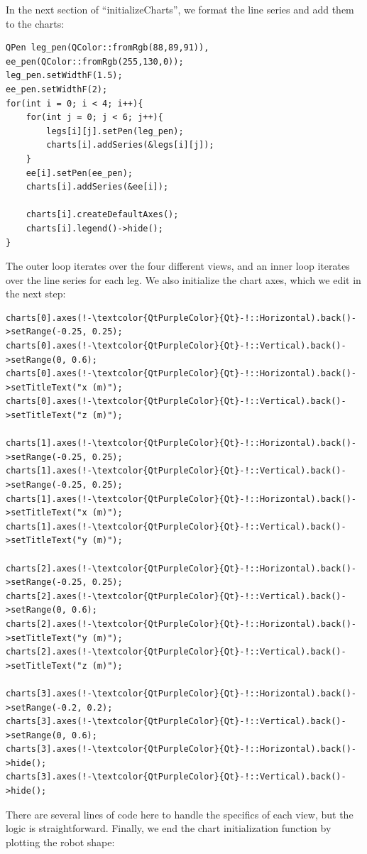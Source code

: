 \documentclass[12pt]{article}
\begin{document}
\newpage \noindent
In the next section of ``initializeCharts'', we format the line series and add them to the charts:
\begin{lstlisting}
QPen leg_pen(QColor::fromRgb(88,89,91)), ee_pen(QColor::fromRgb(255,130,0));
leg_pen.setWidthF(1.5);
ee_pen.setWidthF(2);
for(int i = 0; i < 4; i++){
    for(int j = 0; j < 6; j++){
        legs[i][j].setPen(leg_pen);
        charts[i].addSeries(&legs[i][j]);
    }
    ee[i].setPen(ee_pen);
    charts[i].addSeries(&ee[i]);

    charts[i].createDefaultAxes();
    charts[i].legend()->hide();
}
\end{lstlisting}
The outer loop iterates over the four different views, and an inner loop iterates over the line series for each leg. We also initialize the chart axes, which we edit in the next step:
\begin{lstlisting}
charts[0].axes(!-\textcolor{QtPurpleColor}{Qt}-!::Horizontal).back()->setRange(-0.25, 0.25);
charts[0].axes(!-\textcolor{QtPurpleColor}{Qt}-!::Vertical).back()->setRange(0, 0.6);
charts[0].axes(!-\textcolor{QtPurpleColor}{Qt}-!::Horizontal).back()->setTitleText("x (m)");
charts[0].axes(!-\textcolor{QtPurpleColor}{Qt}-!::Vertical).back()->setTitleText("z (m)");

charts[1].axes(!-\textcolor{QtPurpleColor}{Qt}-!::Horizontal).back()->setRange(-0.25, 0.25);
charts[1].axes(!-\textcolor{QtPurpleColor}{Qt}-!::Vertical).back()->setRange(-0.25, 0.25);
charts[1].axes(!-\textcolor{QtPurpleColor}{Qt}-!::Horizontal).back()->setTitleText("x (m)");
charts[1].axes(!-\textcolor{QtPurpleColor}{Qt}-!::Vertical).back()->setTitleText("y (m)");

charts[2].axes(!-\textcolor{QtPurpleColor}{Qt}-!::Horizontal).back()->setRange(-0.25, 0.25);
charts[2].axes(!-\textcolor{QtPurpleColor}{Qt}-!::Vertical).back()->setRange(0, 0.6);
charts[2].axes(!-\textcolor{QtPurpleColor}{Qt}-!::Horizontal).back()->setTitleText("y (m)");
charts[2].axes(!-\textcolor{QtPurpleColor}{Qt}-!::Vertical).back()->setTitleText("z (m)");

charts[3].axes(!-\textcolor{QtPurpleColor}{Qt}-!::Horizontal).back()->setRange(-0.2, 0.2);
charts[3].axes(!-\textcolor{QtPurpleColor}{Qt}-!::Vertical).back()->setRange(0, 0.6);
charts[3].axes(!-\textcolor{QtPurpleColor}{Qt}-!::Horizontal).back()->hide();
charts[3].axes(!-\textcolor{QtPurpleColor}{Qt}-!::Vertical).back()->hide();
\end{lstlisting}
There are several lines of code here to handle the specifics of each view, but the logic is straightforward. Finally, we end the chart initialization function by plotting the robot shape:
\end{document}
